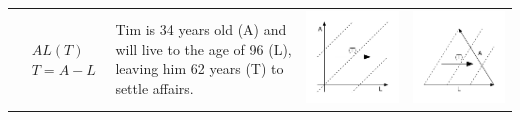 \documentclass[12pt,oneside,letter]{article} %
\begin{document}
\begin{center}
\begin{longtable}{m{}m{}m{}m{}}
  \midrule
  $$\begin{aligned}
    &AL(T) \\
    &T = A - L
  \end{aligned}$$ &  Tim is 34 years old (A) and will live to the age of 96 (L),
  leaving him 62 years (T) to settle affairs.
  & \includegraphics[width = \linewidth]{Figures/JonasTable/ALt.pdf} &
  \includegraphics[width = \linewidth]{Figures/JonasTable/ALt_iso.pdf}  \\

\end{longtable}
\end{center}
\end{document}
